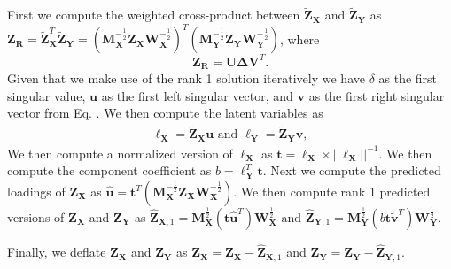 \documentclass[12pt]{article}
\begin{document}
First we compute the weighted cross-product between
\(\widetilde{\mathbf Z}_{\mathbf X}\) and
\(\widetilde{\mathbf Z}_{\mathbf Y}\) as
\({\mathbf Z}_{\mathbf R} = \widetilde{\mathbf Z}_{\mathbf X}^{T}\widetilde{\mathbf Z}_{\mathbf Y} = ({\mathbf M}_{\mathbf X}^{-\frac{1}{2}}{\mathbf Z}_{\mathbf X}{\mathbf W}_{\mathbf X}^{-\frac{1}{2}})^{T}({\mathbf M}_{\mathbf Y}^{-\frac{1}{2}}{\mathbf Z}_{\mathbf Y}{\mathbf W}_{\mathbf Y}^{-\frac{1}{2}})\),
where \begin{equation}
{\mathbf Z}_{\mathbf R} = {\mathbf U} {\boldsymbol \Delta} {\mathbf V}^{T}.
\label{eq:the_svd_for_plscar}
\end{equation} Given that we make use of the rank 1 solution iteratively
we have \(\delta\) as the first singular value, \({\mathbf u}\) as the
first left singular vector, and \({\mathbf v}\) as the first right
singular vector from Eq. \label{eq:the_svd_for_plscar}. We then compute
the latent variables as \begin{equation}
\begin{aligned}
{\boldsymbol \ell}_{\mathbf X} = \widetilde{\mathbf Z}_{\mathbf X}{\mathbf u} \text{ and } {\boldsymbol \ell}_{\mathbf Y} = \widetilde{\mathbf Z}_{\mathbf Y}{\mathbf v},
\label{eq:lvs}
\end{aligned}
\end{equation} We then compute a normalized version of
\({\boldsymbol \ell}_{\mathbf X}\) as
\({\mathbf t} = {\boldsymbol \ell}_{\mathbf X} \times {{\lvert\lvert {\boldsymbol \ell}_{\mathbf X} \rvert\rvert}^{-1}}\).
We then compute the component coefficient as
\(b = {\boldsymbol \ell}_{\mathbf Y}^{T}{\mathbf t}\). Next we compute
the predicted loadings of \({\mathbf Z}_{\mathbf X}\) as
\(\widehat{\mathbf u} = {\mathbf t}^{T} ({\mathbf M}_{\mathbf X}^{-\frac{1}{2}}{\mathbf Z}_{\mathbf X}{\mathbf W}_{\mathbf X}^{-\frac{1}{2}})\).
We then compute rank 1 predicted versions of \({\mathbf Z}_{\mathbf X}\)
and \({\mathbf Z}_{\mathbf Y}\) as
\(\widehat{\mathbf Z}_{{\mathbf X},1} = {\mathbf M}_{\mathbf X}^{\frac{1}{2}}({\mathbf t}\widehat{\mathbf u}^{T}){\mathbf W}_{\mathbf X}^{\frac{1}{2}} \text{ and } \widehat{\mathbf Z}_{{\mathbf Y},1} = {\mathbf M}_{\mathbf Y}^{\frac{1}{2}}(b{\mathbf t}\widetilde{\mathbf v}^{T}){\mathbf W}_{\mathbf Y}^{\frac{1}{2}}\).

Finally, we deflate \({\mathbf Z}_{\mathbf X}\) and
\({\mathbf Z}_{\mathbf Y}\) as
\({\mathbf Z}_{\mathbf X} = {\mathbf Z}_{\mathbf X} - \widehat{\mathbf Z}_{{\mathbf X},1}\)
and
\({\mathbf Z}_{\mathbf Y} = {\mathbf Z}_{\mathbf Y} - \widehat{\mathbf Z}_{{\mathbf Y},1}\).
\end{document}
